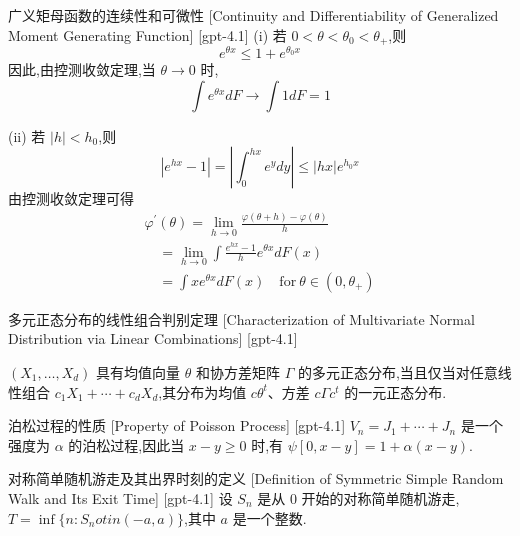 \documentclass[UTF8]{ctexart}
\begin{document}
    \begin{thm}
        {广义矩母函数的连续性和可微性}
        [Continuity and Differentiability of Generalized Moment Generating Function]
        [gpt-4.1]
        (i) 若 $0 < \theta < \theta_{0} < \theta_{+}$,则
\[
e^{\theta x} \leq 1 + e^{\theta_{0} x}
\]
因此,由控测收敛定理,当 $\theta \to 0$ 时,
\[
\int e^{\theta x} dF \to \int 1 dF = 1
\]

(ii) 若 $|h| < h_{0}$,则
\[
|e^{h x} - 1| = \left| \int_{0}^{h x} e^{y} dy \right| \leq |h x| e^{h_{0} x}
\]
由控测收敛定理可得
\[
\begin{array}{l}
\varphi^{\prime} ( \theta ) = \lim_{h \to 0} \frac{ \varphi ( \theta + h ) - \varphi ( \theta ) }{ h } \\[1em]
\quad = \lim_{h \to 0} \int \frac{ e^{h x} - 1 }{ h } e^{\theta x} dF ( x ) \\[1em]
\quad = \int x e^{\theta x} dF ( x ) \quad \mathrm{for} \ \theta \in ( 0 , \theta_{+} )
\end{array}
\]

    \end{thm}
    
    
    
    \begin{thm}
        {多元正态分布的线性组合判别定理}
        [Characterization of Multivariate Normal Distribution via Linear Combinations]
        [gpt-4.1]
        
$(X_1, \ldots, X_d)$ 具有均值向量 $\theta$ 和协方差矩阵 $\Gamma$ 的多元正态分布,当且仅当对任意线性组合 $c_1 X_1 + \cdots + c_d X_d$,其分布为均值 $c \theta^t$、方差 $c \Gamma c^t$ 的一元正态分布.

    \end{thm}
    
    
    
    \begin{ppt}
        {泊松过程的性质}
        [Property of Poisson Process]
        [gpt-4.1]
        $V_{n} = J_{1} + \cdots + J_{n}$ 是一个强度为 $\alpha$ 的泊松过程,因此当 $x - y \geq 0$ 时,有 $\psi[0, x - y] = 1 + \alpha(x - y)$.
    \end{ppt}
    
    
    
    \begin{dfn}
        {对称简单随机游走及其出界时刻的定义}
        [Definition of Symmetric Simple Random Walk and Its Exit Time]
        [gpt-4.1]
        设 $S_{n}$ 是从 $0$ 开始的对称简单随机游走,$T = \operatorname*{inf}\{n : S_{n} 
otin (-a, a)\}$,其中 $a$ 是一个整数.
    \end{dfn}
    
\end{document}
